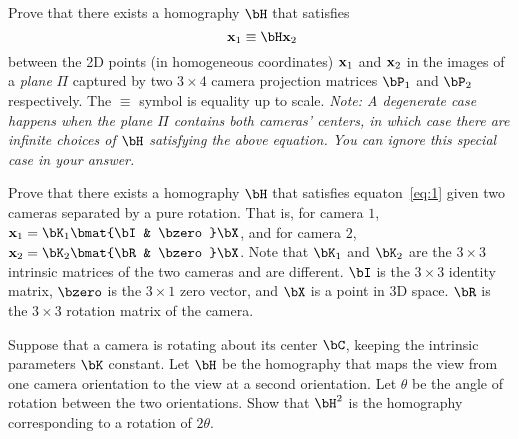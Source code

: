 \begin{problem}
  \begin{enumroman}
    \item Prove that there exists a homography $\bH$ that satisfies
      \begin{equation}~\label{eq:1}
        \bx_1 \equiv \bH \bx_2
      \end{equation}
      between the 2D points (in homogeneous coordinates) $\mathbf{x}_1$ and $\mathbf{x}_2$
      in the images of a \emph{plane} $\Pi$ captured by two $3 \times 4$ camera
      projection matrices $\bP_1$ and $\bP_2$ respectively.
      The $\equiv$ symbol is equality up to scale.
      \emph{
        Note: A degenerate case happens when the plane $\Pi$ contains both cameras'
        centers, in which case there are infinite choices of $\bH$
        satisfying the above equation.
        You can ignore this special case in your answer.
      }

      \begin{answer}

      \end{answer}

    \item Prove that there exists a homography $\bH$ that satisfies equaton~\ref{eq:1}
      given two cameras separated by a pure rotation.
      That is, for camera $1$, $\bx_1 = \bK_1 \bmat{\bI & \bzero} \bX$,
      and for camera $2$, $\bx_2 = \bK_2 \bmat{\bR & \bzero} \bX$.
      Note that $\bK_1$ and $\bK_2$ are the $3 \times 3$ intrinsic matrices
      of the two cameras and are different. $\bI$ is the $3 \times 3$ identity matrix,
      $\bzero$ is the $3 \times 1$ zero vector, and $\bX$ is a point in 3D space.
      $\bR$ is the $3 \times 3$ rotation matrix of the camera.

      \begin{answer}

      \end{answer}

    \item Suppose that a camera is rotating about its center $\bC$,
      keeping the intrinsic parameters $\bK$ constant.
      Let $\bH$ be the homography that maps the view from one camera orientation
      to the view at a second orientation.
      Let $\theta$ be the angle of rotation between the two orientations.
      Show that $\bH^2$ is the homography corresponding to a rotation of $2\theta$.

      \begin{answer}

      \end{answer}
  \end{enumroman}
\end{problem}
